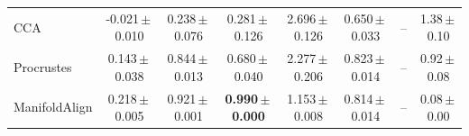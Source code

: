 \begin{table}[t]
\begin{tabular}{lccccccc}
CCA & -0.021\,\tiny{$\pm$\,0.010} & 0.238\,\tiny{$\pm$\,0.076} & 0.281\,\tiny{$\pm$\,0.126} & 2.696\,\tiny{$\pm$\,0.126} & 0.650\,\tiny{$\pm$\,0.033} & -- & 1.38\,\tiny{$\pm$\,0.10} \\
Procrustes & 0.143\,\tiny{$\pm$\,0.038} & 0.844\,\tiny{$\pm$\,0.013} & 0.680\,\tiny{$\pm$\,0.040} & 2.277\,\tiny{$\pm$\,0.206} & 0.823\,\tiny{$\pm$\,0.014} & -- & 0.92\,\tiny{$\pm$\,0.08} \\
ManifoldAlign & 0.218\,\tiny{$\pm$\,0.005} & 0.921\,\tiny{$\pm$\,0.001} & \textbf{0.990\,\tiny{$\pm$\,0.000}} & 1.153\,\tiny{$\pm$\,0.008} & 0.814\,\tiny{$\pm$\,0.014} & -- & 0.08\,\tiny{$\pm$\,0.00} \\
\bottomrule
\end{tabular}
\end{table}
